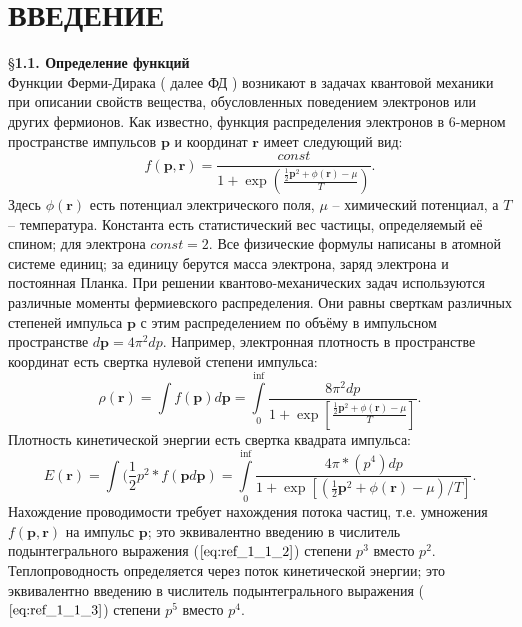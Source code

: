 \chapter{ВВЕДЕНИЕ}

\S \textbf{1.1. Определение функций}
\\

Функции Ферми-Дирака ( далее ФД ) возникают в задачах квантовой механики при описании свойств вещества, обусловленных поведением электронов или других фермионов. Как известно, функция распределения электронов в 6-мерном пространстве импульсов $\textbf{p}$ и координат $\textbf{r}$ имеет следующий вид:
\begin{equation}
f(\textbf{p},\textbf{r})=\frac{const}{1+\exp{(\frac{\frac{1}{2}\textbf{p}^2+\phi(\textbf{r})-\mu}{T})}}.
\label{eq:ref_1_1_1}
\end{equation}
Здесь $\phi(\textbf{r})$ есть потенциал электрического поля, $\mu$ – химический потенциал, а $T$ – температура. Константа есть статистический вес частицы, определяемый её спином; для электрона $const = 2$. Все физические формулы написаны в атомной системе единиц; за единицу берутся масса электрона, заряд электрона и постоянная Планка.
\indent
\newline
При решении квантово-механических задач используются различные моменты фермиевского распределения. Они равны сверткам различных степеней импульса $\textbf{p}$ с этим распределением по объёму в импульсном пространстве $d\textbf{p}=4\pi^2dp$. Например, электронная плотность в пространстве координат есть свертка нулевой степени импульса:
\begin{equation}
\rho (\textbf{r}) = \int f(\textbf{p}) d \textbf{p} = \int\limits_0^{\inf} \frac{8\pi^2 dp}{1 +\exp[\frac{\frac{1}{2} \textbf{p}^2 + \phi(\textbf{r}) - \mu}{T}]}.
\label{eq:ref_1_1_2}
\end{equation}
Плотность кинетической энергии есть свертка квадрата импульса:
\begin{equation}
E(\textbf{r}) = \int(\frac{1}{2}p^2*f(\textbf{p}d\textbf{p}) = \int\limits_0^{\inf} \frac{4\pi*(p^4)dp}{1+\exp[(\frac{1}{2}\textbf{p}^2 + \phi(\textbf{r}) - \mu) / T]}.
\label{eq:ref_1_1_3}
\end{equation}
Нахождение проводимости требует нахождения потока частиц, т.е. умножения $f(\textbf{p}, \textbf{r})$ на импульс $\textbf{p}$; это эквивалентно введению в числитель подынтегрального выражения ($\ref{eq:ref_1_1_2}$) степени $p^3$ вместо $p^2$. Теплопроводность определяется через поток кинетической энергии; это эквивалентно введению в числитель подынтегрального выражения ($\ref{eq:ref_1_1_3}$) степени $p^5$ вместо $p^4$.

